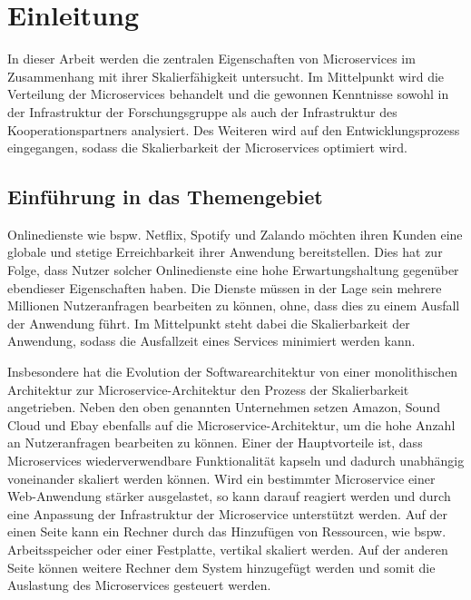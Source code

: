 \chapter{Einleitung}
\label{cha:einleitung}

In dieser Arbeit werden die zentralen Eigenschaften von Microservices im Zusammenhang mit ihrer Skalierfähigkeit untersucht.
Im Mittelpunkt wird die Verteilung der Microservices behandelt und die gewonnen Kenntnisse sowohl in der Infrastruktur der Forschungsgruppe als auch der Infrastruktur des Kooperationspartners analysiert.
Des Weiteren wird auf den Entwicklungsprozess eingegangen, sodass die Skalierbarkeit der Microservices optimiert wird.

\section{Einführung in das Themengebiet}


Onlinedienste wie bspw. Netflix, Spotify und Zalando möchten ihren Kunden eine globale und stetige Erreichbarkeit ihrer Anwendung bereitstellen.
Dies hat zur Folge, dass Nutzer solcher Onlinedienste eine hohe Erwartungshaltung gegenüber ebendieser Eigenschaften haben.
Die Dienste müssen in der Lage sein mehrere Millionen Nutzeranfragen bearbeiten zu können, ohne, dass dies zu einem Ausfall der Anwendung führt.
Im Mittelpunkt steht dabei die Skalierbarkeit der Anwendung, sodass die Ausfallzeit eines Services minimiert werden kann.

Insbesondere hat die Evolution der Softwarearchitektur von einer monolithischen Architektur zur Microservice-Architektur den Prozess der Skalierbarkeit angetrieben.
Neben den oben genannten Unternehmen setzen Amazon, Sound Cloud und Ebay ebenfalls auf die Microservice-Architektur, um die hohe Anzahl an Nutzeranfragen bearbeiten zu können.
Einer der Hauptvorteile ist, dass Microservices wiederverwendbare Funktionalität kapseln und dadurch unabhängig voneinander skaliert werden können.
Wird ein bestimmter Microservice einer Web-Anwendung stärker ausgelastet, so kann darauf reagiert werden und durch eine Anpassung der Infrastruktur der Microservice unterstützt werden.
Auf der einen Seite kann ein Rechner durch das Hinzufügen von Ressourcen, wie bspw. Arbeitsspeicher oder einer Festplatte, vertikal skaliert werden.
Auf der anderen Seite können weitere Rechner dem System hinzugefügt werden und somit die Auslastung des Microservices gesteuert werden.

